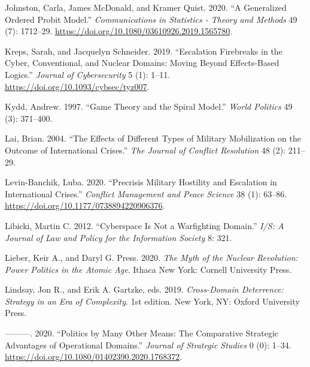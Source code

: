 \documentclass[
]{article}
\newlength{\cslhangindent}
\newlength{\cslentryspacingunit} %
\newenvironment{CSLReferences}[2] %
 {%
  \setlength{\parindent}{0pt}
  \ifodd #1
  \let\oldpar\par
  \def\par{\hangindent=\cslhangindent\oldpar}
  \fi
  \setlength{\parskip}{#2\cslentryspacingunit}
 }%
 {}
\begin{document}
\begin{CSLReferences}{1}{0}
\leavevmode{}%
Johnston, Carla, James McDonald, and Kramer Quist. 2020. {``A Generalized Ordered {Probit} Model.''} \emph{Communications in Statistics - Theory and Methods} 49 (7): 1712--29. \url{https://doi.org/10.1080/03610926.2019.1565780}.

\leavevmode{}%
Kreps, Sarah, and Jacquelyn Schneider. 2019. {``Escalation Firebreaks in the Cyber, Conventional, and Nuclear Domains: Moving Beyond Effects-Based Logics.''} \emph{Journal of Cybersecurity} 5 (1): 1--11. \url{https://doi.org/10.1093/cybsec/tyz007}.

\leavevmode{}%
Kydd, Andrew. 1997. {``Game {Theory} and the {Spiral Model}.''} \emph{World Politics} 49 (3): 371--400.

\leavevmode{}%
Lai, Brian. 2004. {``The {Effects} of {Different Types} of {Military Mobilization} on the {Outcome} of {International Crises}.''} \emph{The Journal of Conflict Resolution} 48 (2): 211--29.

\leavevmode{}%
Levin-Banchik, Luba. 2020. {``Precrisis Military Hostility and Escalation in International Crises.''} \emph{Conflict Management and Peace Science} 38 (1): 63--86. \url{https://doi.org/10.1177/0738894220906376}.

\leavevmode{}%
Libicki, Martin C. 2012. {``Cyberspace {Is Not} a {Warfighting Domain}.''} \emph{I/S: A Journal of Law and Policy for the Information Society} 8: 321.

\leavevmode{}%
Lieber, Keir A., and Daryl G. Press. 2020. \emph{The {Myth} of the {Nuclear Revolution}: {Power Politics} in the {Atomic Age}}. {Ithaca New York}: {Cornell University Press}.

\leavevmode{}%
Lindsay, Jon R., and Erik A. Gartzke, eds. 2019. \emph{Cross-Domain Deterrence: Strategy in an Era of Complexity}. 1st edition. {New York, NY}: {Oxford University Press}.

\leavevmode{}%
---------. 2020. {``Politics by Many Other Means: {The} Comparative Strategic Advantages of Operational Domains.''} \emph{Journal of Strategic Studies} 0 (0): 1--34. \url{https://doi.org/10.1080/01402390.2020.1768372}.


\end{CSLReferences}
\end{document}

